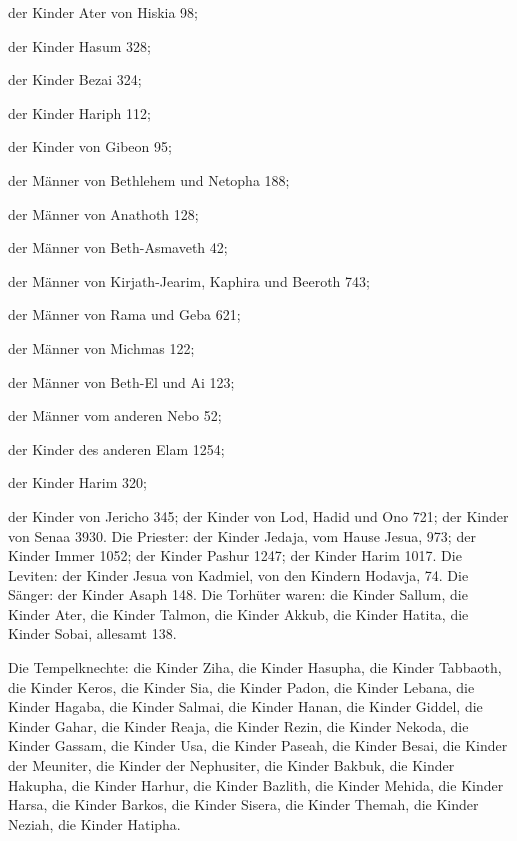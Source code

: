  der Kinder Ater von Hiskia 98;

 der Kinder Hasum 328;

 der Kinder Bezai 324;

 der Kinder Hariph 112;

 der Kinder von Gibeon 95;

 der Männer von Bethlehem und Netopha 188;

 der Männer von Anathoth 128;

 der Männer von Beth-Asmaveth 42;

 der Männer von Kirjath-Jearim, Kaphira und Beeroth 743;

 der Männer von Rama und Geba 621;

 der Männer von Michmas 122;

 der Männer von Beth-El und Ai 123;

 der Männer vom anderen Nebo 52;

 der Kinder des anderen Elam 1254;

 der Kinder Harim 320;

 der Kinder von Jericho 345;  der Kinder
von Lod, Hadid und Ono 721;  der Kinder von Senaa 3930.
 Die Priester: der Kinder Jedaja, vom Hause Jesua, 973;
 der Kinder Immer 1052;  der Kinder Pashur
1247;  der Kinder Harim 1017.  Die
Leviten: der Kinder Jesua von Kadmiel, von den Kindern Hodavja, 74.
 Die Sänger: der Kinder Asaph 148.  Die
Torhüter waren: die Kinder Sallum, die Kinder Ater, die Kinder Talmon,
die Kinder Akkub, die Kinder Hatita, die Kinder Sobai, allesamt 138.

 Die Tempelknechte: die Kinder Ziha, die Kinder Hasupha,
die Kinder Tabbaoth,  die Kinder Keros, die Kinder Sia,
die Kinder Padon,  die Kinder Lebana, die Kinder Hagaba,
die Kinder Salmai,  die Kinder Hanan, die Kinder Giddel,
die Kinder Gahar,  die Kinder Reaja, die Kinder Rezin,
die Kinder Nekoda,  die Kinder Gassam, die Kinder Usa,
die Kinder Paseah,  die Kinder Besai, die Kinder der
Meuniter, die Kinder der Nephusiter,  die Kinder Bakbuk,
die Kinder Hakupha, die Kinder Harhur,  die Kinder
Bazlith, die Kinder Mehida, die Kinder Harsa,  die Kinder
Barkos, die Kinder Sisera, die Kinder Themah,  die Kinder
Neziah, die Kinder Hatipha.

